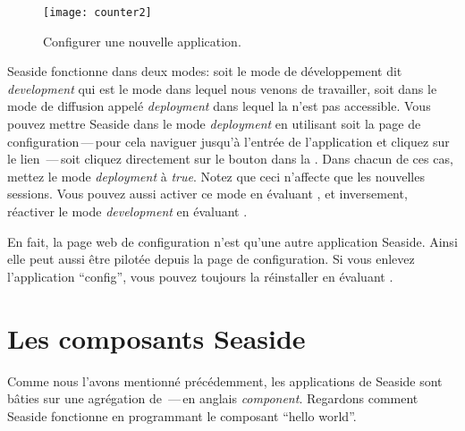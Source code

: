 \documentclass[a4paper,10pt,twoside]{book}
\begin{document}
\begin{figure}[ht]
\begin{center}
\texttt{[image: counter2]}
\caption{Configurer une nouvelle application.}
\end{center}
\end{figure}

Seaside fonctionne dans deux modes: soit le mode de développement dit 
\emph{development} qui est le mode dans lequel nous venons de travailler,
soit dans le mode de diffusion appelé \emph{deployment} dans lequel la
\toolbar n'est pas accessible. 
Vous pouvez mettre Seaside dans le mode \emph{deployment} en utilisant
soit la page de configuration\,---\,pour cela naviguer jusqu'à
l'entrée de l'application et cliquez sur le lien \,---\,soit
cliquez directement sur le bouton   dans la
\toolbar.
Dans chacun de ces cas, mettez le mode \emph{deployment} à
\emph{true}.
Notez que ceci n'affecte que les nouvelles sessions.
Vous pouvez aussi activer ce mode en évaluant 
 , et
inversement, réactiver le mode \emph{development} en évaluant
.

En fait, la page web de configuration n'est qu'une autre application
Seaside. Ainsi elle peut aussi être pilotée depuis la page de
configuration. Si vous enlevez l'application
``config'', vous pouvez toujours la réinstaller en évaluant
 .

\section{Les composants Seaside}


Comme nous l'avons mentionné précédemment, les applications de
Seaside sont bâties sur une agrégation de
  \,---\,en anglais \emph{component}.
Regardons comment Seaside fonctionne en programmant le composant
``hello world''.
\end{document}
